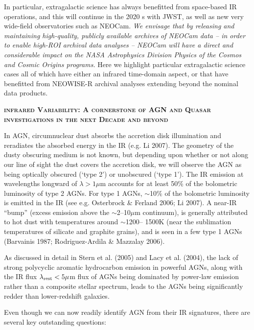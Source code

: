 \documentclass[12pt]{article}
\begin{document}
\smallskip
\smallskip
\noindent
In particular, extragalactic science has always benefitted from space-based IR operations, and this will continue in the 2020
s with JWST, as well as new very wide-field observatories such as NEOCam. 
{\it We envisage that by releasing and maintaining high-quality, publicly available archives of NEOCam data -- 
in order to enable high-ROI archival data analyses -- 
NEOCam will have a direct and considerable impact on the NASA Astrophysics Division {\it Physics of the Cosmos} and {\it Cosmic Origins} programs.}
Here we highlight particular extragalactic science cases all of which have either an infrared time-domain aspect, or that have benefitted from NEOWISE-R archival analyses extending beyond the nominal data products. 


\smallskip
\smallskip
\noindent
{\bfseries \textsc{\textcolor{Cerulean}{infrared Variability: A
cornerstone of AGN and Quasar investigations in the next Decade and
beyond}}} 


\smallskip
\smallskip
\noindent
In AGN, circumnuclear dust absorbs the accretion disk illumination and
reradiates the absorbed energy in the IR (e.g. Li 2007). The geometry
of the dusty obscuring medium is not known, but depending upon whether or 
not along our line of sight the dust covers the accretion disk, we will 
observe the AGN as being optically obscured (`type 2') or unobscured
(`type 1'). The IR emission at wavelengths longward of $\lambda > 1
\mu$m accounts for at least 50\% of the bolometric luminosity of type
2 AGNs. For type 1 AGNs, $\sim$10\% of the bolometric luminosity is
emitted in the IR (see e.g. Osterbrock \& Ferland 2006; Li 2007). A
near-IR ``bump'' (excess emission above the $\sim$2–10$\mu$m
continuum), is generally attributed to hot dust with temperatures
around $\sim$1200– 1500K (near the sublimation temperatures of
silicate and graphite grains), and is seen in a few type 1 AGNs
(Barvainis 1987; Rodriguez-Ardila \& Mazzalay 2006).

\smallskip
\smallskip
\noindent
As discussed in detail in Stern et al. (2005) and Lacy et al. (2004), the lack of strong
polycyclic aromatic hydrocarbon emission in powerful AGNs, along with
the IR flux $\lambda_{\rm rest} < 5 \mu$m flux of AGNs being dominated
by power-law emission rather than a composite stellar spectrum, leads
to the AGNs being significantly redder than lower-redshift galaxies.

\smallskip
\smallskip
\noindent
Even though we can now readily identify AGN from their IR signatures, 
there are several key outstanding questions:  
\end{document}
